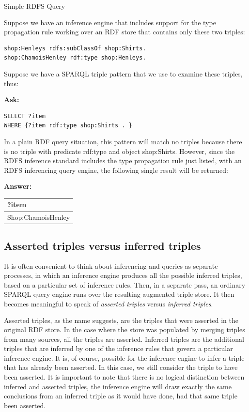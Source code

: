 \begin{example}{Simple RDFS Query}
\label{ex:7.1}

Suppose we have an inference engine that includes support for the type
propagation rule working over an RDF
store that contains only these two triples:

\begin{lstlisting}
shop:Henleys rdfs:subClassOf shop:Shirts. 
shop:ChamoisHenley rdf:type shop:Henleys.
\end{lstlisting}

Suppose we have a SPARQL triple pattern that we use to examine these
triples, thus:

\textbf{Ask:}

\begin{lstlisting}
SELECT ?item
WHERE {?item rdf:type shop:Shirts . }
\end{lstlisting}

In a plain RDF query situation, this pattern will match no triples
because there is no triple with predicate rdf:type and object
shop:Shirts. However, since the RDFS inference standard includes the
type propagation rule just listed, with an RDFS inferencing query
engine, the following single result will be returned:

\textbf{Answer:}

\begin{tabular}{|l|}
\hline
?item\\
\hline
Shop:ChamoisHenley\\
\hline
\end{tabular}

\subsection{Asserted triples versus inferred triples}

It is often convenient to think about inferencing and queries as
separate processes, in which an inference engine produces all the
possible inferred triples, based on a particular set of inference rules.
Then, in a separate pass, an ordinary SPARQL query engine runs over the
resulting augmented triple store. It then becomes meaningful to speak of
\emph{asserted triples} versus \emph{inferred triples}.

Asserted triples, as the name suggests, are the triples that were
asserted in the original RDF store. In the case where the store was
populated by merging triples from many sources, all the triples are
asserted. Inferred triples are the additional triples that are inferred
by one of the inference rules that govern a particular inference engine.
It is, of course, possible for the inference engine to infer a triple
that has already been asserted. In this case, we still consider the
triple to have been asserted. It is important to note that there is no
logical distinction between inferred and asserted triples, the inference
engine will draw exactly the same conclusions from an inferred triple as
it would have done, had that same triple been asserted.
\end{example}

